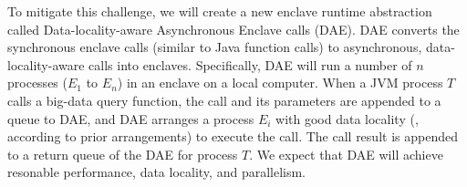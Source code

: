 



To mitigate this challenge, we will create a new enclave runtime abstraction 
called Data-locality-aware Asynchronous Enclave calls (DAE). DAE converts the 
synchronous enclave calls (similar to Java function calls) to asynchronous, 
data-locality-aware calls into enclaves. Specifically, DAE will run a number of 
$n$ processes ($E_{1}$ to $E_{n}$) in an enclave on a local computer. When a 
JVM process $T$ calls a big-data query function, the call and its parameters 
are appended to a queue to DAE, and DAE arranges a process $E_{i}$ with good 
data locality (\eg, according to prior arrangements) to execute the call. The 
call result is appended to a return queue of the DAE for process $T$. We expect 
that DAE will achieve resonable performance, data locality, and parallelism.


